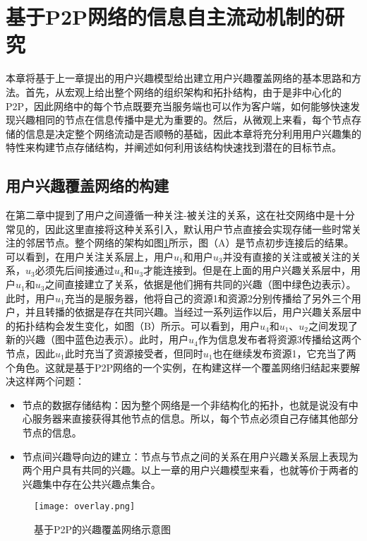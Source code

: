\section{基于P2P网络的信息自主流动机制的研究}
本章将基于上一章提出的用户兴趣模型给出建立用户兴趣覆盖网络的基本思路和方法。首先，从宏观上给出整个网络的组织架构和拓扑结构，由于是非中心化的P2P，因此网络中的每个节点既要充当服务端也可以作为客户端，如何能够快速发现兴趣相同的节点在信息传播中是尤为重要的。然后，从微观上来看，每个节点存储的信息是决定整个网络流动是否顺畅的基础，因此本章将充分利用用户兴趣集的特性来构建节点存储结构，并阐述如何利用该结构快速找到潜在的目标节点。

\subsection{用户兴趣覆盖网络的构建}
在第二章中提到了用户之间遵循一种关注-被关注的关系，这在社交网络中是十分常见的，因此这里直接将这种关系引入，默认用户节点直接会实现存储一些时常关注的邻居节点。整个网络的架构如图\ref{fig:overlay}所示，图（A）是节点初步连接后的结果。可以看到，在用户关注关系层上，用户$u_1$和用户$u_3$并没有直接的关注或被关注的关系，$u_3$必须先后间接通过$u_4$和$u_3$才能连接到。但是在上面的用户兴趣关系层中，用户$u_1$和$u_3$之间直接建立了关系，依据是他们拥有共同的兴趣（图中绿色边表示）。此时，用户$u_1$充当的是服务器，他将自己的资源1和资源2分别传播给了另外三个用户，并且转播的依据是存在共同兴趣。当经过一系列运作以后，用户兴趣关系层中的拓扑结构会发生变化，如图（B）所示。可以看到，用户$u_4$和$u_1$、$u_2$之间发现了新的兴趣（图中蓝色边表示）。此时，用户$u_4$作为信息发布者将资源3传播给这两个节点，因此$u_1$此时充当了资源接受者，但同时$u_1$也在继续发布资源1，它充当了两个角色。这就是基于P2P网络的一个实例，在构建这样一个覆盖网络归结起来要解决这样两个问题：
\begin{itemize}
  \item 节点的数据存储结构：因为整个网络是一个非结构化的拓扑，也就是说没有中心服务器来直接获得其他节点的信息。所以，每个节点必须自己存储其他部分节点的信息。
  \item 节点间兴趣导向边的建立：节点与节点之间的关系在用户兴趣关系层上表现为两个用户具有共同的兴趣。以上一章的用户兴趣模型来看，也就等价于两者的兴趣集中存在公共兴趣点集合。
\end{itemize}

\begin{figure}[!ht]
\centering
\texttt{[image: overlay.png]}
\caption{基于P2P的兴趣覆盖网络示意图}
\label{fig:overlay}
\end{figure}


